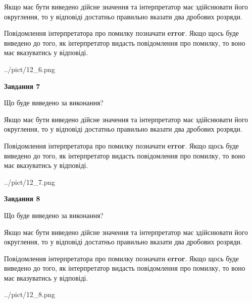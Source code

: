 \documentclass[12pt, ukrainian]{article}
\begin{document}
{\begin {Large}
Якщо має бути виведено дійсне значення та інтерпретатор має здійснювати його округлення, 
то у відповіді достатньо правильно вказати два дробових розряди.

Повідомлення інтерпретатора про помилку позначати \textbf{error}.
Якщо щось буде виведено до того, як інтерпретатор видасть повідомлення про помилку, 
то воно має вказуватись у відповіді. \par

\begin{center}
	{../pict/12_6.png}
\end{center}
\newpage

{\begin {center}\textbf{Завдання 7}\end {center}}\par
Що буде виведено за виконання? \par

Якщо має бути виведено дійсне значення та інтерпретатор має здійснювати його округлення, 
то у відповіді достатньо правильно вказати два дробових розряди.

Повідомлення інтерпретатора про помилку позначати \textbf{error}.
Якщо щось буде виведено до того, як інтерпретатор видасть повідомлення про помилку, 
то воно має вказуватись у відповіді. \par

\begin{center}
	{../pict/12_7.png}
\end{center}
\newpage

{\begin {center}\textbf{Завдання 8}\end {center}}\par
Що буде виведено за виконання? \par

Якщо має бути виведено дійсне значення та інтерпретатор має здійснювати його округлення, 
то у відповіді достатньо правильно вказати два дробових розряди.

Повідомлення інтерпретатора про помилку позначати \textbf{error}.
Якщо щось буде виведено до того, як інтерпретатор видасть повідомлення про помилку, 
то воно має вказуватись у відповіді. \par

\begin{center}
	{../pict/12_8.png}
\end{center}
\newpage


\end{Large}}
\end{document}

